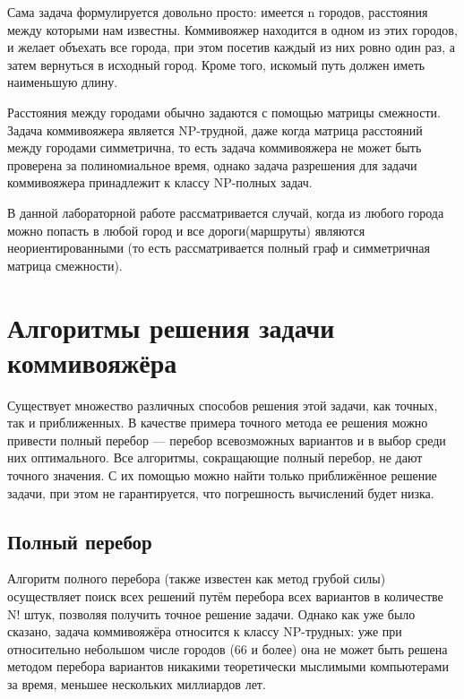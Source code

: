 \documentclass[a4paper,14pt]{report}
\begin{document}
Сама  задача  формулируется  довольно  просто:  имеется n городов, расстояния между которыми нам известны. Коммивояжер находится в одном из этих городов, и желает объехать все города, при этом посетив каждый из них  ровно  один  раз, а  затем вернуться  в  исходный  город. Кроме  того, искомый путь должен иметь наименьшую длину.

Расстояния между городами обычно задаются с помощью матрицы смежности.
Задача  коммивояжера  является NP-трудной,  даже  когда матрица расстояний между городами симметрична, то есть задача коммивояжера не может быть проверена за полиномиальное время, однако задача разрешения для задачи коммивояжера принадлежит к классу NP-полных задач.

В данной лабораторной работе рассматривается случай, когда из любого города можно попасть в любой город и все дороги(маршруты) являются неориентированными (то есть рассматривается полный граф и симметричная матрица смежности).

\section*{Алгоритмы решения задачи коммивояжёра}

Существует множество различных способов решения этой задачи, как точных, так и приближенных. В качестве примера точного метода ее решения можно  привести  полный  перебор  — перебор  всевозможных вариантов и в выбор среди них оптимального. Все  алгоритмы,  сокращающие  полный  перебор,  не  дают  точного значения. С их помощью можно найти только приближённое решение задачи, при этом не гарантируется, что погрешность вычислений будет низка.

\subsection*{Полный перебор}

Алгоритм  полного перебора  (также  известен  как  метод  грубой  силы) осуществляет  поиск  всех  решений  путём  перебора  всех  вариантов  в количестве N! штук, позволяя получить точное решение задачи. Однако как уже было сказано, задача коммивояжёра относится к классу NP-трудных: уже при относительно небольшом числе городов (66 и более) она не может быть решена методом перебора вариантов никакими теоретически мыслимыми компьютерами за время, меньшее нескольких миллиардов лет.
\end{document}
